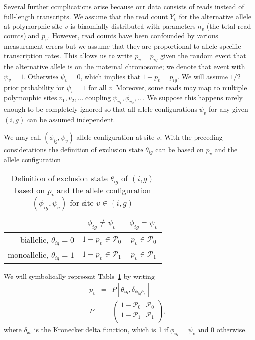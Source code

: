 \documentclass[letterpaper]{article}
\begin{document}
Several further complications arise because our data consists of reads instead
of full-length transcripts.  We assume that the read count \(Y_v\) for the
alternative allele at polymorphic site \(v\) is binomially distributed with
parameters \(n_v\) (the total read counts) and \(p_{v}\).  However, read
counts have been confounded by various measurement errors but we assume that
they are proportional to allele specific transcription rates.  This allows us
to write \(p_v = p_{ig}\) given the random event that the alternative allele is on
the maternal chromosome; we denote that event with \(\psi_v=1\).
Otherwise \(\psi_v=0\), which implies that \(1-p_v=p_{ig}\).  We will assume
\(1/2\) prior probability for \(\psi_v=1\) for all \(v\).  Moreover, some
reads may map to multiple polymorphic sites \(v_1,v_2,...\) coupling
\(\psi_{v_1},\phi_{v_2},...\).  We suppose this happens rarely enough to be
completely ignored so that all allele configurations \(\psi_v\) for any given
\((i,g)\) can be assumed independent.

We may call \((\phi_{ig},\psi_v)\) allele configuration at site \(v\).  
With the preceding considerations the definition of exclusion state
\(\theta_{ig}\) can be
based on \(p_v\) and the allele configuration
\begin{table}[h]
\begin{center}
\begin{tabular}{r|cc|}
& \(\phi_{ig}\neq\psi_v\) & \(\phi_{ig}=\psi_v\) \\
\hline
biallelic, \(\theta_{ig}=0\) & \(1-p_v \in \mathcal{P}_0\) & \(p_v \in \mathcal{P}_0\) \\
monoallelic, \(\theta_{ig}=1\) & \(1-p_v \in \mathcal{P}_1\) & \(p_v \in \mathcal{P}_1\) \\
\hline
\end{tabular}
\caption{
Definition of exclusion state \(\theta_{ig}\) of \((i,g)\) based on
\(p_v\) and the allele configuration \((\phi_{ig},\psi_v)\) for
site \(v\in(i,g)\)
}
\label{tab:def-exclusion-state}
\end{center}
\end{table}

We will symbolically represent Table~\ref{tab:def-exclusion-state} by writing
\begin{eqnarray}
\label{eq:p-v-by-P-matrix}
p_v &=& P[\theta_{ig},\delta_{\phi_{ig}\psi_v}] \\
\label{eq:P-matrix}
P &=&
\begin{pmatrix}
1-\mathcal{P}_0 & \mathcal{P}_0 \\
1-\mathcal{P}_1 & \mathcal{P}_1 \\
\end{pmatrix},
\end{eqnarray}
where \(\delta_{ab}\) is
the Kronecker delta function, which is 1 if \(\phi_{ig}=\psi_v\) and 0
otherwise.
\end{document}
